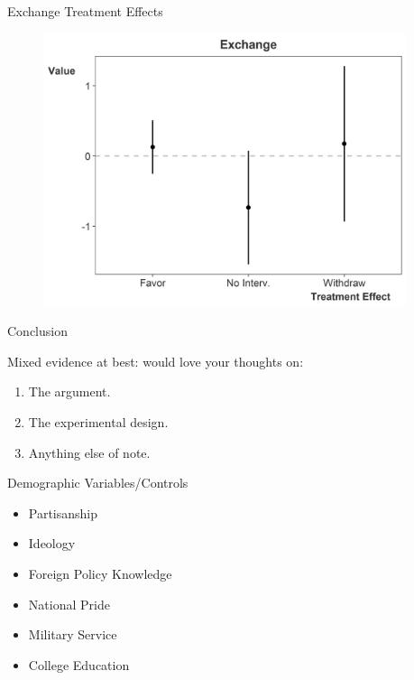 \documentclass[12pt]{beamer}
\begin{document}


\begin{frame}{Exchange Treatment Effects}

\begin{figure}[htbp]
	\centering
		\includegraphics[width=0.95\textwidth]{ex-treat.png}
\end{figure}


\end{frame}



\begin{frame}{Conclusion}

Mixed evidence at best: would love your thoughts on:

\pause
\begin{enumerate}
\item The argument. 
\pause
\item The experimental design. 
\pause
\item Anything else of note. 
\end{enumerate}


\end{frame}



\appendix 


\begin{frame}{Demographic Variables/Controls}

\begin{itemize}
\item Partisanship
\item Ideology
\item Foreign Policy Knowledge
\item National Pride 
\item Military Service
\item College Education
\end{itemize} 

\end{frame}
\end{document}
